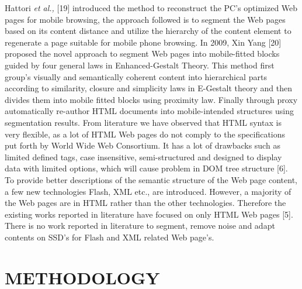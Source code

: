 \documentclass[fleqn,twoside]{article}
\begin{document}
\vskip 2mm
 Hattori {\it et al.,} [19] introduced the method to reconstruct the PC's optimized Web pages for mobile browsing, the approach followed is to segment the Web pages based on its content distance and utilize the hierarchy of the content element to regenerate a page suitable for mobile phone browsing. In 2009, Xin Yang [20] proposed the novel approach to segment Web pages into mobile-fitted blocks guided by four general laws in Enhanced-Gestalt Theory. This method first group's visually and semantically coherent content into hierarchical parts according to similarity, closure and simplicity laws in E-Gestalt theory and then divides them into mobile fitted blocks using proximity law. Finally through proxy automatically re-author HTML documents into mobile-intended structures using segmentation results.
\vskip 2mm
From literature we have observed that HTML syntax is very flexible, as a lot of HTML Web pages do not comply to the specifications put forth by World Wide Web Consortium.  It has a lot of drawbacks such as limited defined tags, case insensitive, semi-structured and designed to display data with limited options, which will cause problem in DOM tree structure [6]. To provide better descriptions of the semantic structure of the Web page content, a few new technologies Flash, XML etc., are introduced. However, a majority of the Web pages are in HTML rather than the other technologies. Therefore the existing works reported in literature have focused on only HTML Web pages [5]. There is no work reported in literature to segment, remove noise and adapt contents on SSD's for Flash and XML related Web page's. 


\section{METHODOLOGY}
\end{document}
